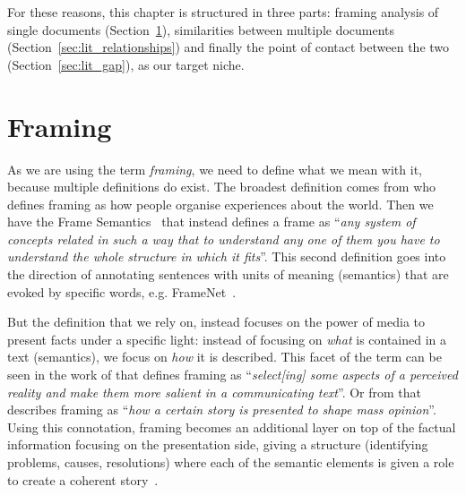 
For these reasons, this chapter is structured in three parts: framing analysis of single documents (Section~\ref{sec:lit_framing}), similarities between multiple documents (Section~\ref{sec:lit_relationships}) and finally the point of contact between the two (Section~\ref{sec:lit_gap}), as our target niche.


\section{Framing}
\label{sec:lit_framing}

As we are using the term \emph{framing}, we need to define what we mean with it, because multiple definitions do exist.
The broadest definition comes from \citet{goffman1974frame} who defines framing as how people organise experiences about the world.
Then we have the Frame Semantics~\cite{fillmore2006frame} that instead defines a frame as ``\textit{any system of concepts related in such a way that to understand any one of them you have to understand the whole structure in which it fits}''. This second definition goes into the direction of annotating sentences with units of meaning (semantics) that are evoked by specific words, e.g. FrameNet~\cite{baker1998berkeley}.

But the definition that we rely on, instead focuses on the power of media to present facts under a specific light: instead of focusing on \emph{what} is contained in a text (semantics), we focus on \emph{how} it is described.
This facet of the term can be seen in the work of
\citet{entman1993framing} that defines framing as ``\textit{select[ing] some aspects of a perceived reality and make them more salient in a communicating text}''.
Or from \citet{goffman1974frame} that describes framing as ``\textit{how a certain story is presented to shape mass opinion}''.
Using this connotation, framing becomes an additional layer on top of the factual information focusing on the presentation side, giving a structure (identifying problems, causes, resolutions) where each of the semantic elements is given a role to create a coherent story~\cite{pan1993framing}.


